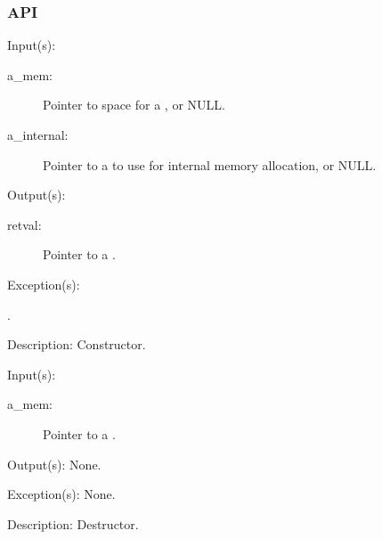 \subsubsection{API}
\begin{capi}
\label{mem_new}
	\begin{capilist}
	\item[Input(s): ]
		\begin{description}\item[]
		\item[a\_mem: ]
			Pointer to space for a , or NULL.
		\item[a\_internal: ]
			Pointer to a  to use for internal
			memory allocation, or NULL.
		\end{description}
	\item[Output(s): ]
		\begin{description}\item[]
		\item[retval: ]
			Pointer to a .
		\end{description}
	\item[Exception(s): ]
		\begin{description}\item[]
		\item[.]
		\end{description}
	\item[Description: ]
		Constructor.
	\end{capilist}
\label{mem_delete}
	\begin{capilist}
	\item[Input(s): ]
		\begin{description}\item[]
		\item[a\_mem: ]
			Pointer to a \classname{mem}.
		\end{description}
	\item[Output(s): ] None.
	\item[Exception(s): ] None.
	\item[Description: ]
		Destructor.
	\end{capilist}
\label{mem_malloc_e}

\end{capi}
